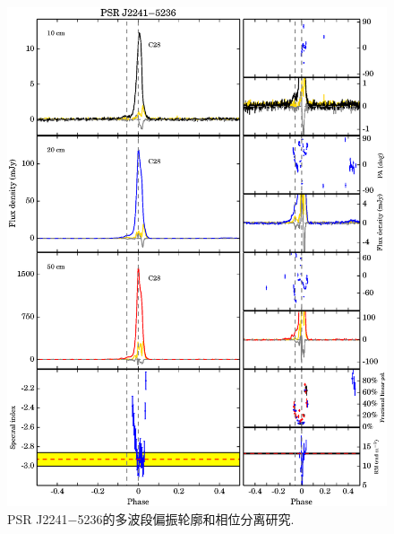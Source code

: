 \begin{figure}
\begin{center}
\includegraphics[width=6 in]{2241.ps}
\caption{PSR J2241$-$5236的多波段偏振轮廓和相位分离研究.}
\label{2241}
\end{center}
\end{figure}

\pkuthssffaq

